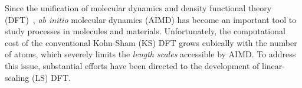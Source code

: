 \documentclass[aps,prl,reprint,amsmath,amssymb]{revtex4-1}
\newcommand*{\MAINTEXT}{}
\begin{document}
\fi

\maketitle

\ifdefined\MAINTEXT



Since the unification of molecular dynamics and density functional theory (DFT)~\cite{a:thecpmd},
\emph{ab initio} molecular dynamics (AIMD) has become an important tool to study processes in molecules and materials.
Unfortunately, the computational cost of the conventional Kohn-Sham (KS) DFT grows cubically with the number of atoms, which severely limits the \emph{length scales} accessible by AIMD. %
To address this issue, substantial efforts have been directed to the development of linear-scaling (LS) DFT.
\end{document}
